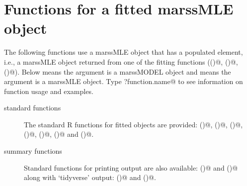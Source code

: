 \section{Functions for a fitted marssMLE object}
The following functions use a marssMLE object that has a populated \verb@par@ element, i.e., a marssMLE object returned from one of the fitting functions (\verb@MARSS()@, \verb@MARSSkem()@, \verb@MARSSoptim()@).  Below \verb@MODELobj@ means the argument is a marssMODEL object and \verb@MLEobj@ means the argument is a marssMLE object.  Type \verb@?function.name@ to see information on function usage and examples.
\begin{description}
  \item[standard functions] The standard R functions for fitted objects are provided: \verb@residuals()@, \verb@fitted()@, \verb@logLik()@, \verb@AIC()@, \verb@coef()@, \verb@predict()@ and \verb@tsSmooth()@.
  \item[summary functions] Standard functions for printing output are also available: \verb@summary()@ and \verb@print()@ along with `tidyverse' output: \verb@tidy()@ and \verb@glance()@.
\end{description}

